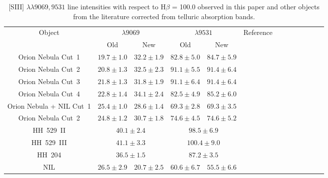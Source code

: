 \documentclass[fleqn,usenatbib]{mnras}
\begin{document}
\begin{table}
\centering
\caption{[S\thinspace III] $\lambda \lambda 9069, 9531$ line intensities with respect to H$\beta$ = 100.0 observed in this paper and other objects from the literature corrected from telluric absorption bands.}
\label{tab:tellabs}
\begin{tabular}{ccccccccccccc}
\hline
Object &   \multicolumn{2}{c}{$\lambda 9069$} & \multicolumn{2}{c}{$\lambda 9531$} & Reference\\
 & Old & New  & Old & New & \\
\hline

Orion Nebula Cut~1 & $19.7 \pm 1.0$ & $32.2\pm 1.9$& $82.8  \pm 5.0$ & $84.7 \pm 5.9$ & \multirow{4}{*}{\citet{mendez2021}}\\

Orion Nebula Cut~2 & $20.8 \pm 1.3$ &  $32.5 \pm 2.3$& $91.1\pm 5.5$&$91.4 \pm 6.4 $\\

Orion Nebula Cut~3 & $21.8\pm 1.3$ & $31.8\pm 1.9$& $91.1\pm 6.4$&$91.4 \pm 6.4$\\

Orion Nebula Cut~4 &$22.8 \pm 1.4$ & $ 34.1 \pm 2.4$ & $82.5\pm 4.9$ & $85.2\pm6.0$\\


Orion Nebula + NIL Cut~1 & $25.4\pm 1.0$ & $28.6\pm 1.4$ & $ 69.3 \pm 2.8$ & $69.3 \pm 3.5$ & \multirow{2}{*}{\citet{mendez2021-2}}\\

Orion Nebula Cut~2 & $24.8\pm 1.2$ & $30.7\pm 1.8$ & $74.6\pm 4.5$ & $74.6\pm 5.2$ \\

HH~529~II & \multicolumn{2}{c}{$40.1 \pm 2.4$} &  \multicolumn{2}{c}{$98.5 \pm 6.9$}&\multirow{2}{*}{\citet{mendez2021}}\\

HH~529~III & \multicolumn{2}{c}{$41.1 \pm 3.3$} &  \multicolumn{2}{c}{$100.4 \pm 9.0$}&\\

HH~204 & \multicolumn{2}{c}{$36.5 \pm 1.5$} & \multicolumn{2}{c}{$87.2\pm 3.5$}\\

NIL & $26.5\pm 2.9$ & $20.7\pm2.5$& $ 60.6\pm 6.7$& $55.5\pm 6.6$& \citet{mendez2021-2}\\

\hline
\end{tabular}
\end{table}
\end{document}
